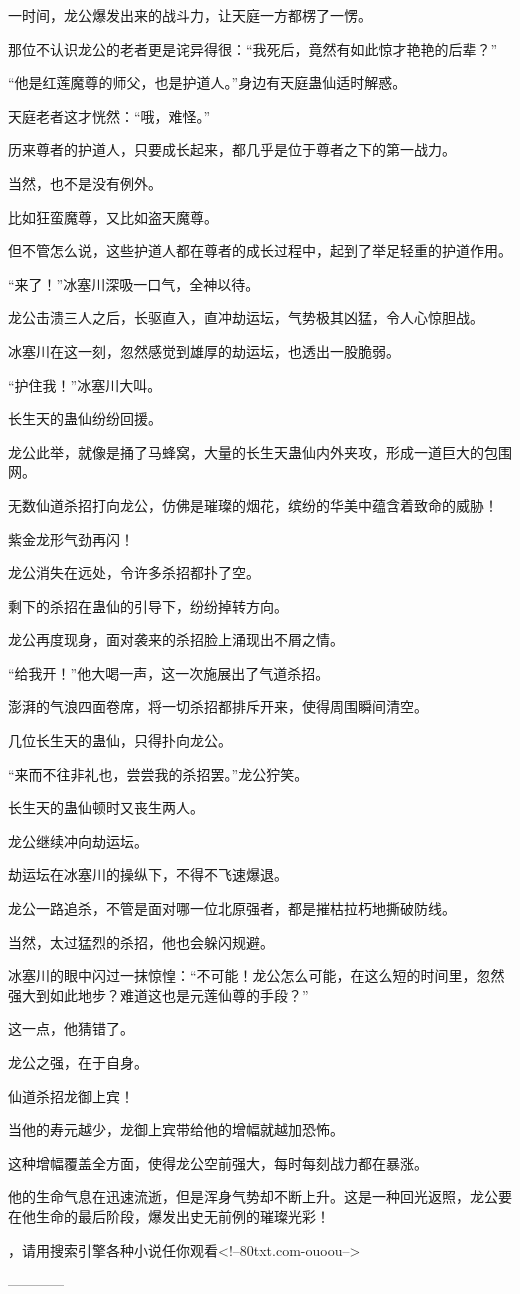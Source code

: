 \begin{this_body}
一时间，龙公爆发出来的战斗力，让天庭一方都楞了一愣。

那位不认识龙公的老者更是诧异得很：“我死后，竟然有如此惊才艳艳的后辈？”

“他是红莲魔尊的师父，也是护道人。”身边有天庭蛊仙适时解惑。

天庭老者这才恍然：“哦，难怪。”

历来尊者的护道人，只要成长起来，都几乎是位于尊者之下的第一战力。

当然，也不是没有例外。

比如狂蛮魔尊，又比如盗天魔尊。

但不管怎么说，这些护道人都在尊者的成长过程中，起到了举足轻重的护道作用。

“来了！”冰塞川深吸一口气，全神以待。

龙公击溃三人之后，长驱直入，直冲劫运坛，气势极其凶猛，令人心惊胆战。

冰塞川在这一刻，忽然感觉到雄厚的劫运坛，也透出一股脆弱。

“护住我！”冰塞川大叫。

长生天的蛊仙纷纷回援。

龙公此举，就像是捅了马蜂窝，大量的长生天蛊仙内外夹攻，形成一道巨大的包围网。

无数仙道杀招打向龙公，仿佛是璀璨的烟花，缤纷的华美中蕴含着致命的威胁！

紫金龙形气劲再闪！

龙公消失在远处，令许多杀招都扑了空。

剩下的杀招在蛊仙的引导下，纷纷掉转方向。

龙公再度现身，面对袭来的杀招脸上涌现出不屑之情。

“给我开！”他大喝一声，这一次施展出了气道杀招。

澎湃的气浪四面卷席，将一切杀招都排斥开来，使得周围瞬间清空。

几位长生天的蛊仙，只得扑向龙公。

“来而不往非礼也，尝尝我的杀招罢。”龙公狞笑。

长生天的蛊仙顿时又丧生两人。

龙公继续冲向劫运坛。

劫运坛在冰塞川的操纵下，不得不飞速爆退。

龙公一路追杀，不管是面对哪一位北原强者，都是摧枯拉朽地撕破防线。

当然，太过猛烈的杀招，他也会躲闪规避。

冰塞川的眼中闪过一抹惊惶：“不可能！龙公怎么可能，在这么短的时间里，忽然强大到如此地步？难道这也是元莲仙尊的手段？”

这一点，他猜错了。

龙公之强，在于自身。

仙道杀招龙御上宾！

当他的寿元越少，龙御上宾带给他的增幅就越加恐怖。

这种增幅覆盖全方面，使得龙公空前强大，每时每刻战力都在暴涨。

他的生命气息在迅速流逝，但是浑身气势却不断上升。这是一种回光返照，龙公要在他生命的最后阶段，爆发出史无前例的璀璨光彩！

，请用搜索引擎各种小说任你观看<!--80txt.com-ouoou-->

------------

\end{this_body}

